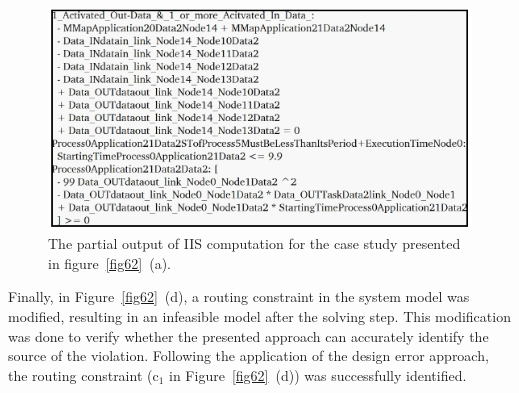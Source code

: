        \begin{figure}[b!]
    	\centering
    	\includegraphics[width=1\columnwidth]{figures/iis_output1.pdf}
    	\caption{The partial output of IIS computation for the case study presented in figure~\ref{fig62}~(a).}
    	\label{fig63}
    \end{figure}
      
    Finally, in Figure~\ref{fig62}~(d), a routing constraint in the system model was modified, resulting in an infeasible model after the solving step. This modification was done to verify whether the presented approach can accurately identify the source of the violation. Following the application of the design error approach, the routing constraint (c$_1$ in Figure~\ref{fig62}~(d)) was successfully identified.  

